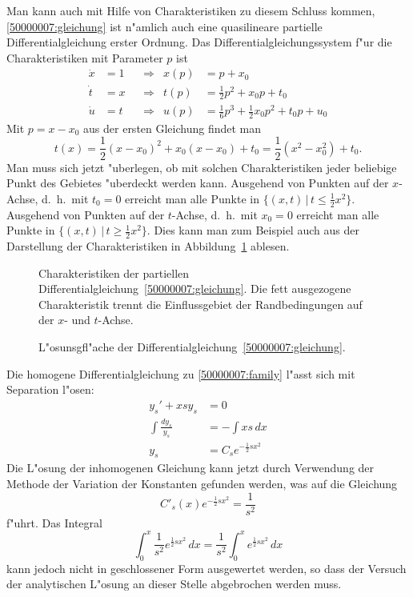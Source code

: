 \begin{loesung}
\begin{teilaufgaben}
Man kann auch mit Hilfe von Charakteristiken zu diesem Schluss kommen, 
\eqref{50000007:gleichung} ist n"amlich auch eine quasilineare partielle
Differentialgleichung erster Ordnung.
Das Differentialgleichungssystem f"ur die Charakteristiken mit Parameter $p$
ist
\begin{align*}
\dot x&=1&&\Rightarrow&x(p)&=p+x_0\\
\dot t&=x&&\Rightarrow&t(p)&=\frac12p^2+x_0p+t_0\\
\dot u&=t&&\Rightarrow&u(p)&=\frac16p^3+\frac12x_0p^2+t_0p+u_0
\end{align*}
Mit $p=x-x_0$ aus der ersten Gleichung findet man
\[
t(x)=\frac12(x-x_0)^2+x_0(x-x_0)+t_0=\frac12(x^2-x_0^2)+t_0.
\]
Man muss sich jetzt "uberlegen, ob mit solchen Charakteristiken
jeder beliebige Punkt des Gebietes "uberdeckt werden kann.
Ausgehend von Punkten auf der $x$-Achse, d.~h.~mit $t_0=0$
erreicht man alle Punkte in $\{(x,t)\,|\, t\le \frac12x^2\}$.
Ausgehend von Punkten auf der $t$-Achse, d.~h.~mit $x_0=0$
erreicht man alle Punkte in $\{(x,t)\,|\, t\ge \frac12x^2\}$.
Dies kann man zum Beispiel auch aus der Darstellung
der Charakteristiken in Abbildung~\ref{50000007:bild}
ablesen.
\begin{figure}
\begin{center}
\end{center}
\caption{Charakteristiken der partiellen
Differentialgleichung~\eqref{50000007:gleichung}.
Die fett ausgezogene Charakteristik trennt die Einflussgebiet der
Randbedingungen auf der $x$- und $t$-Achse.
\label{50000007:bild}}
\end{figure}
\begin{figure}
\centering
{}
\caption{L"osunsgfl"ache der Differentialgleichung~\eqref{50000007:gleichung}.
\label{50000007:loesungsflaeche}}
\end{figure}
\item
Die homogene Differentialgleichung zu \eqref{50000007:family} l"asst sich
mit Separation l"osen:
\begin{align*}
y_s'  + xsy_s&=0
\\
\int\frac{dy_s}{y_s}&=-\int xs\,dx
\\
y_s&=C_se^{-\frac12sx^2}
\end{align*}
Die L"osung der inhomogenen Gleichung kann jetzt durch Verwendung der
Methode der Variation der Konstanten gefunden werden, was auf die
Gleichung 
\[
C'_s(x)e^{-\frac12sx^2}=\frac1{s^2}
\]
f"uhrt.
Das Integral 
\[
\int_0^x\frac1{s^2}e^{\frac12sx^2}\,dx
=\frac1{s^2}
\int_0^xe^{\frac12sx^2}\,dx
\]
kann jedoch nicht in geschlossener Form ausgewertet werden, so dass der
Versuch der analytischen L"osung an dieser Stelle abgebrochen werden muss.
\qedhere
\end{teilaufgaben}
\end{loesung}

